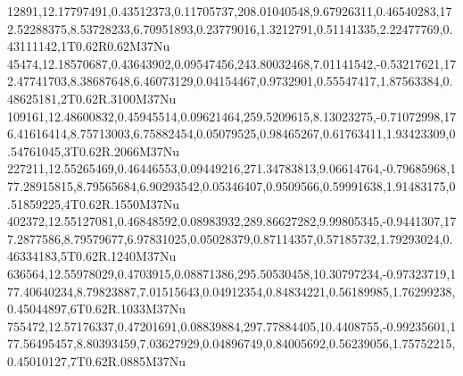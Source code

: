 12891,12.17797491,0.43512373,0.11705737,208.01040548,9.67926311,0.46540283,172.52288375,8.53728233,6.70951893,0.23779016,1.3212791,0.51141335,2.22477769,0.43111142,1T0.62R0.62M37Nu
45474,12.18570687,0.43643902,0.09547456,243.80032468,7.01141542,-0.53217621,172.47741703,8.38687648,6.46073129,0.04154467,0.9732901,0.55547417,1.87563384,0.48625181,2T0.62R.3100M37Nu
109161,12.48600832,0.45945514,0.09621464,259.5209615,8.13023275,-0.71072998,176.41616414,8.75713003,6.75882454,0.05079525,0.98465267,0.61763411,1.93423309,0.54761045,3T0.62R.2066M37Nu
227211,12.55265469,0.46446553,0.09449216,271.34783813,9.06614764,-0.79685968,177.28915815,8.79565684,6.90293542,0.05346407,0.9509566,0.59991638,1.91483175,0.51859225,4T0.62R.1550M37Nu
402372,12.55127081,0.46848592,0.08983932,289.86627282,9.99805345,-0.9441307,177.2877586,8.79579677,6.97831025,0.05028379,0.87114357,0.57185732,1.79293024,0.46334183,5T0.62R.1240M37Nu
636564,12.55978029,0.4703915,0.08871386,295.50530458,10.30797234,-0.97323719,177.40640234,8.79823887,7.01515643,0.04912354,0.84834221,0.56189985,1.76299238,0.45044897,6T0.62R.1033M37Nu
755472,12.57176337,0.47201691,0.08839884,297.77884405,10.4408755,-0.99235601,177.56495457,8.80393459,7.03627929,0.04896749,0.84005692,0.56239056,1.75752215,0.45010127,7T0.62R.0885M37Nu

